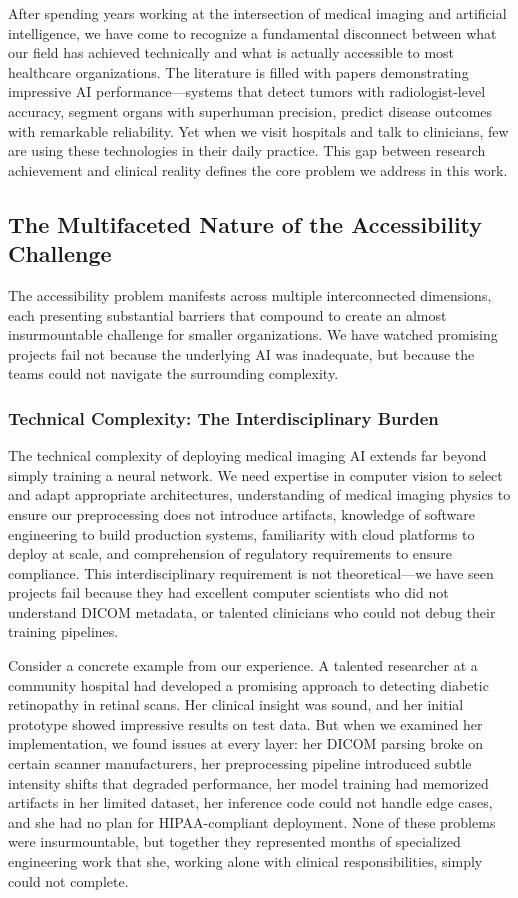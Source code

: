 \documentclass[12pt,a4paper]{article}
\begin{document}
After spending years working at the intersection of medical imaging and artificial intelligence, we have come to recognize a fundamental disconnect between what our field has achieved technically and what is actually accessible to most healthcare organizations. The literature is filled with papers demonstrating impressive AI performance—systems that detect tumors with radiologist-level accuracy, segment organs with superhuman precision, predict disease outcomes with remarkable reliability. Yet when we visit hospitals and talk to clinicians, few are using these technologies in their daily practice. This gap between research achievement and clinical reality defines the core problem we address in this work.

\subsection{The Multifaceted Nature of the Accessibility Challenge}

The accessibility problem manifests across multiple interconnected dimensions, each presenting substantial barriers that compound to create an almost insurmountable challenge for smaller organizations. We have watched promising projects fail not because the underlying AI was inadequate, but because the teams could not navigate the surrounding complexity.

\subsubsection{Technical Complexity: The Interdisciplinary Burden}

The technical complexity of deploying medical imaging AI extends far beyond simply training a neural network. We need expertise in computer vision to select and adapt appropriate architectures, understanding of medical imaging physics to ensure our preprocessing does not introduce artifacts, knowledge of software engineering to build production systems, familiarity with cloud platforms to deploy at scale, and comprehension of regulatory requirements to ensure compliance. This interdisciplinary requirement is not theoretical—we have seen projects fail because they had excellent computer scientists who did not understand DICOM metadata, or talented clinicians who could not debug their training pipelines.

Consider a concrete example from our experience. A talented researcher at a community hospital had developed a promising approach to detecting diabetic retinopathy in retinal scans. Her clinical insight was sound, and her initial prototype showed impressive results on test data. But when we examined her implementation, we found issues at every layer: her DICOM parsing broke on certain scanner manufacturers, her preprocessing pipeline introduced subtle intensity shifts that degraded performance, her model training had memorized artifacts in her limited dataset, her inference code could not handle edge cases, and she had no plan for HIPAA-compliant deployment. None of these problems were insurmountable, but together they represented months of specialized engineering work that she, working alone with clinical responsibilities, simply could not complete.
\end{document}
